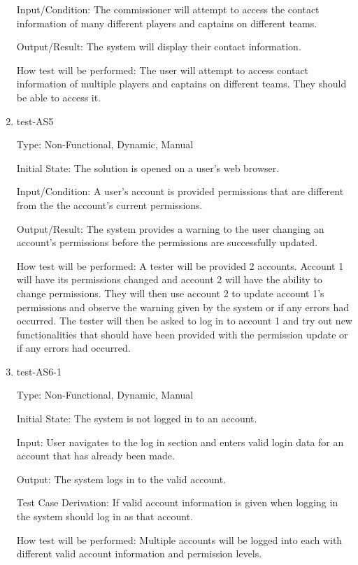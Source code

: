 \documentclass[12pt, titlepage]{article}
\begin{document}
\begin{enumerate}
  Input/Condition: The commissioner will attempt to access the contact
  information of many different players and captains on different teams.

  Output/Result: The system will display their contact information.

  How test will be performed: The user will attempt to access contact
  information of multiple players and captains on different teams. They should
  be able to access it.

  \item{test-AS5\\}

  Type: Non-Functional, Dynamic, Manual

  Initial State: The solution is opened on a user's web browser.

  Input/Condition: A user's account is provided permissions that are different from the
  the account's current permissions.

  Output/Result: The system provides a warning to the user changing an account's
  permissions before the permissions are successfully updated.

  How test will be performed: A tester will be provided 2 accounts. Account 1 will have its
  permissions changed and account 2 will have the ability to change permissions. They will then
  use account 2 to update account 1's permissions and observe the warning given by the system
  or if any errors had occurred. The tester will then be asked to log in to account 1 and try
  out new functionalities that should have been provided with the permission update or if any
  errors had occurred.

  \item{test-AS6-1\\}
  
  Type: Non-Functional, Dynamic, Manual

  Initial State: The system is not logged in to an account.

  Input: User navigates to the log in section and enters valid login data for
  an account that has already been made.

  Output: The system logs in to the valid account.

  Test Case Derivation: If valid account information is given when logging in
  the system should log in as that account.

  How test will be performed: Multiple accounts will be logged into each with
  different valid account information and permission levels.


\end{enumerate}
\end{document}
